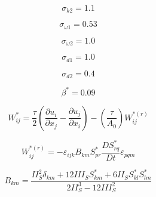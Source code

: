 {\newpage\clearpage
{}%
\begin{displaymath}
\sigma_{k2} = 1.1
\end{displaymath}%
\lthtmldisplayZ
\lthtmlcheckvsize\clearpage}

{\newpage\clearpage
{}%
\begin{displaymath}
\sigma_{\omega 1} = 0.53
\end{displaymath}%
\lthtmldisplayZ
\lthtmlcheckvsize\clearpage}

{\newpage\clearpage
{}%
\begin{displaymath}
\sigma_{\omega 2} = 1.0
\end{displaymath}%
\lthtmldisplayZ
\lthtmlcheckvsize\clearpage}

{\newpage\clearpage
{}%
\begin{displaymath}
\sigma_{d 1} = 1.0
\end{displaymath}%
\lthtmldisplayZ
\lthtmlcheckvsize\clearpage}

{\newpage\clearpage
{}%
\begin{displaymath}
\sigma_{d 2} = 0.4
\end{displaymath}%
\lthtmldisplayZ
\lthtmlcheckvsize\clearpage}

{\newpage\clearpage
{}%
\begin{displaymath}
\beta^* = 0.09
\end{displaymath}%
\lthtmldisplayZ
\lthtmlcheckvsize\clearpage}

{\newpage\clearpage
{}%
\begin{displaymath}
W_{ij}^* = \frac{\tau}{2} \left( \frac{\partial u_i}{\partial x_j} - \frac{\partial u_j}{\partial x_i} \right)
  - \left( \frac{\tau}{A_0} \right) W_{ij}^{*(r)}
\end{displaymath}%
\lthtmldisplayZ
\lthtmlcheckvsize\clearpage}

{\newpage\clearpage
{}%
\begin{displaymath}
W_{ij}^{*(r)} = -\varepsilon_{ijk} B_{km} S_{pr}^* \frac{D S_{rq}^*}{Dt} \varepsilon_{pqm}
\end{displaymath}%
\lthtmldisplayZ
\lthtmlcheckvsize\clearpage}

{\newpage\clearpage
{}%
\begin{displaymath}
B_{km} = \frac{II_S^2 \delta_{km} + 12 III_S S_{km}^* + 6 II_S S_{kl}^* S_{lm}^*}{2 II_S^3 - 12 III_S^2}
\end{displaymath}%
\lthtmldisplayZ
\lthtmlcheckvsize\clearpage}


